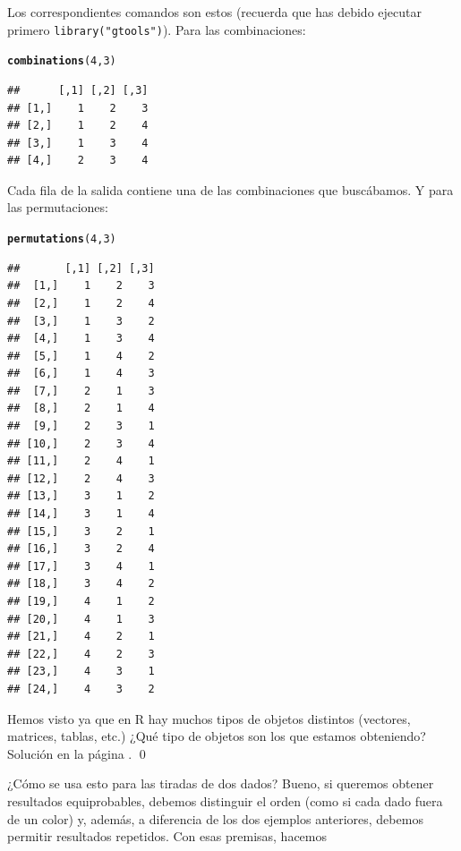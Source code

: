 \documentclass[10pt,a4paper]{article}\usepackage[]{graphicx}\usepackage[]{color}
\makeatletter
\newcommand{\hlnum}[1]{\textcolor[rgb]{0.686,0.059,0.569}{#1}}%
\newcommand{\hlstd}[1]{\textcolor[rgb]{0.345,0.345,0.345}{#1}}%
\newcommand{\hlkwd}[1]{\textcolor[rgb]{0.737,0.353,0.396}{\textbf{#1}}}%
\newenvironment{kframe}{%
 \def\at@end@of@kframe{}%
 \ifinner\ifhmode%
  \def\at@end@of@kframe{\end{minipage}}%
  \begin{minipage}{\columnwidth}%
 \fi\fi%
 \def\FrameCommand##1{\hskip\@totalleftmargin \hskip-\fboxsep
 \colorbox{shadecolor}{##1}\hskip-\fboxsep
     \hskip-\linewidth \hskip-\@totalleftmargin \hskip\columnwidth}%
 \MakeFramed {\advance\hsize-\width
   \@totalleftmargin\z@ \linewidth\hsize
   \@setminipage}}%
 {\par\unskip\endMakeFramed%
 \at@end@of@kframe}
\newenvironment{knitrout}{}{} %
\newcounter {cont01}
\makeatother
\begin{document}
      Los correspondientes comandos son estos (recuerda que has debido ejecutar primero {\tt library("gtools")}). Para las combinaciones:
\begin{knitrout}
\color{fgcolor}\begin{kframe}
\begin{alltt}
\hlkwd{combinations}\hlstd{(}\hlnum{4}\hlstd{,}\hlnum{3}\hlstd{)}
\end{alltt}
\begin{verbatim}
##      [,1] [,2] [,3]
## [1,]    1    2    3
## [2,]    1    2    4
## [3,]    1    3    4
## [4,]    2    3    4
\end{verbatim}
\end{kframe}
\end{knitrout}
           Cada fila de la salida contiene una de las combinaciones que buscábamos. Y para las permutaciones:
\begin{knitrout}
\color{fgcolor}\begin{kframe}
\begin{alltt}
\hlkwd{permutations}\hlstd{(}\hlnum{4}\hlstd{,}\hlnum{3}\hlstd{)}
\end{alltt}
\begin{verbatim}
##       [,1] [,2] [,3]
##  [1,]    1    2    3
##  [2,]    1    2    4
##  [3,]    1    3    2
##  [4,]    1    3    4
##  [5,]    1    4    2
##  [6,]    1    4    3
##  [7,]    2    1    3
##  [8,]    2    1    4
##  [9,]    2    3    1
## [10,]    2    3    4
## [11,]    2    4    1
## [12,]    2    4    3
## [13,]    3    1    2
## [14,]    3    1    4
## [15,]    3    2    1
## [16,]    3    2    4
## [17,]    3    4    1
## [18,]    3    4    2
## [19,]    4    1    2
## [20,]    4    1    3
## [21,]    4    2    1
## [22,]    4    2    3
## [23,]    4    3    1
## [24,]    4    3    2
\end{verbatim}
\end{kframe}
\end{knitrout}
           \begin{ejercicio}
      \label{tut03:ejercicio13}
      \quad
      Hemos visto ya que en R hay muchos tipos de objetos distintos (vectores, matrices, tablas, etc.) ¿Qué tipo de objetos son los que estamos obteniendo? Solución en la página \pageref{tut03:ejercicio13:sol}.
      \qed
      \end{ejercicio}
      ¿Cómo se usa esto para las tiradas de dos dados? Bueno, si queremos obtener resultados equiprobables, debemos distinguir el orden (como si cada dado fuera de un color) y, además, a diferencia de los dos ejemplos anteriores, debemos permitir resultados repetidos. Con esas premisas, hacemos
\end{document}
